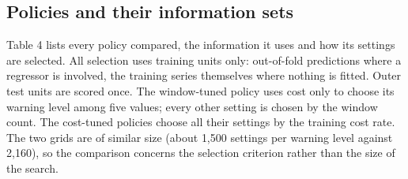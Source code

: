 \documentclass[a4paper,fleqn,doubleblind]{cas-dc}
\begin{document}
\subsection{Policies and their information sets}

Table 4 lists every policy compared, the information it uses and how its settings are selected. All selection uses training units only: out-of-fold predictions where a regressor is involved, the training series themselves where nothing is fitted. Outer test units are scored once. The window-tuned policy uses cost only to choose its warning level among five values; every other setting is chosen by the window count. The cost-tuned policies choose all their settings by the training cost rate. The two grids are of similar size (about 1,500 settings per warning level against 2,160), so the comparison concerns the selection criterion rather than the size of the search.
\end{document}
